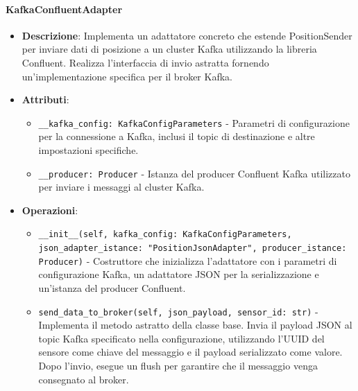 \documentclass[10pt]{article}
\begin{document}
    \paragraph{KafkaConfluentAdapter}
    \begin{itemize} 
    \item \textbf{Descrizione}: Implementa un adattatore concreto che estende PositionSender per inviare dati di posizione a un cluster Kafka utilizzando la libreria Confluent. Realizza l'interfaccia di invio astratta fornendo un'implementazione specifica per il broker Kafka.
    \item \textbf{Attributi}:
    \begin{itemize}
        \item \texttt{\_\_kafka\_config: KafkaConfigParameters} - Parametri di configurazione per la connessione a Kafka, inclusi il topic di destinazione e altre impostazioni specifiche.
        \item \texttt{\_\_producer: Producer} - Istanza del producer Confluent Kafka utilizzato per inviare i messaggi al cluster Kafka.
    \end{itemize}
    
    \item \textbf{Operazioni}:
    \begin{itemize}
        \item \texttt{\_\_init\_\_(self, kafka\_config: KafkaConfigParameters, json\_adapter\_istance: "PositionJsonAdapter", producer\_istance: Producer)} - Costruttore che inizializza l'adattatore con i parametri di configurazione Kafka, un adattatore JSON per la serializzazione e un'istanza del producer Confluent.
        
        \item \texttt{send\_data\_to\_broker(self, json\_payload, sensor\_id: str)} - Implementa il metodo astratto della classe base. Invia il payload JSON al topic Kafka specificato nella configurazione, utilizzando l'UUID del sensore come chiave del messaggio e il payload serializzato come valore. Dopo l'invio, esegue un flush per garantire che il messaggio venga consegnato al broker.
    \end{itemize}
    \end{itemize}
\end{document}
